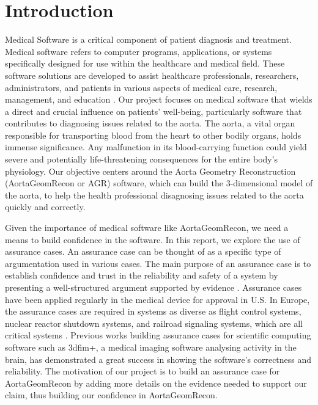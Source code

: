 \chapter{Introduction} \label{intro}

Medical Software is a critical component of patient diagnosis and treatment. Medical software refers to computer programs, applications, or systems specifically designed for use within the healthcare and medical field. These software solutions are developed to assist healthcare professionals, researchers, administrators, and patients in various aspects of medical care, research, management, and education \cite{medical_software}. Our project focuses on medical software that wields a direct and crucial influence on patients' well-being, particularly software that contributes to diagnosing issues related to the aorta. The aorta, a vital organ responsible for transporting blood from the heart to other bodily organs, holds immense significance. Any malfunction in its blood-carrying function could yield severe and potentially life-threatening consequences for the entire body's physiology. Our objective centers around the Aorta Geometry Reconstruction (AortaGeomRecon or AGR) software, which can build the 3-dimensional model of the aorta, to help the health professional disagnosing issues related to the aorta quickly and correctly.

Given the importance of medical software like AortaGeomRecon, we need a means to build confidence in the software. In this report, we explore the use of assurance cases. An assurance case can be thought of as a specific type of argumentation used in various cases. The main purpose of an assurance case is to establish confidence and trust in the reliability and safety of a system by presenting a well-structured argument supported by evidence \cite{Weinstock_2013}. Assurance cases have been applied regularly in the medical device for approval in U.S. In Europe, the assurance cases are required in systems as diverse as flight control systems, nuclear reactor shutdown systems, and railroad signaling systems, which are all critical systems \cite{Weinstock_2013}. Previous works \cite{scs_ac} building assurance cases for scientific computing software such as 3dfim+, a medical imaging software analysing activity in the brain, has demonstrated a great success in showing the software's correctness and reliability. The motivation of our project is to build an assurance case for AortaGeomRecon by adding more details on the evidence needed to support our claim, thus building our confidence in AortaGeomRecon.

